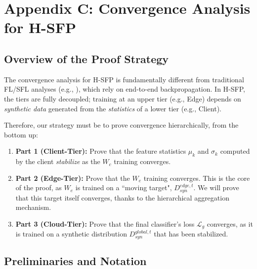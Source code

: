 \section*{Appendix C: Convergence Analysis for H-SFP}
\label{sec:appendix_convergence}
\subsection*{Overview of the Proof Strategy}
\label{sec:proof_overview}

The convergence analysis for H-SFP is fundamentally different from traditional FL/SFL analyses (e.g., \cite{10980018}), which rely on end-to-end backpropagation. In H-SFP, the tiers are fully decoupled; training at an upper tier (e.g., Edge) depends on \textit{synthetic data} generated from the \textit{statistics} of a lower tier (e.g., Client).

Therefore, our strategy must be to prove convergence hierarchically, from the bottom up:
\begin{enumerate}
    \item \textbf{Part 1 (Client-Tier):} Prove that the feature statistics $\mu_k$ and $\sigma_k$ computed by the client \textit{stabilize} as the $W_c$ training converges.
    \item \textbf{Part 2 (Edge-Tier):} Prove that the $W_e$ training converges. This is the core of the proof, as $W_e$ is trained on a ``moving target", $D_{syn}^{edge, t}$. We will prove that this target itself converges, thanks to the hierarchical aggregation mechanism.
    \item \textbf{Part 3 (Cloud-Tier):} Prove that the final classifier's loss $\mathcal{L}_g$ converges, as it is trained on a synthetic distribution $D_{syn}^{global, t}$ that has been stabilized.
\end{enumerate}

\subsection*{Preliminaries and Notation}
\label{sec:preliminaries}

